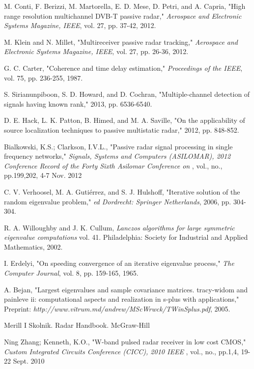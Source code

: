 \documentclass[12pt,openany,a4paper]{book}
\begin{document}
\begin{thebibliography}{99}
 M. Conti, F. Berizzi, M. Martorella, E. D. Mese, D. Petri, and A. Capria, "High range resolution multichannel DVB-T passive radar," \emph{Aerospace and Electronic Systems Magazine, IEEE}, vol. 27, pp. 37-42, 2012.

 M. Klein and N. Millet, "Multireceiver passive radar tracking," \emph{Aerospace and Electronic Systems Magazine, IEEE}, vol. 27, pp. 26-36, 2012.

 G. C. Carter, "Coherence and time delay estimation," \emph{Proceedings of the IEEE}, vol. 75, pp. 236-255, 1987.

 S. Sirianunpiboon, S. D. Howard, and D. Cochran, "Multiple-channel detection of signals having known rank," 2013, pp. 6536-6540.

 D. E. Hack, L. K. Patton, B. Himed, and M. A. Saville, "On the applicability of source localization techniques to passive multistatic radar," 2012, pp. 848-852.

 Bialkowski, K.S.; Clarkson, I.V.L., "Passive radar signal processing in single frequency networks," \emph{Signals, Systems and Computers (ASILOMAR), 2012 Conference Record of the Forty Sixth Asilomar Conference on} , vol., no., pp.199,202, 4-7 Nov. 2012

 C. V. Verhoosel, M. A. Gutiérrez, and S. J. Hulshoff, "Iterative solution of the random eigenvalue problem," \emph{ed Dordrecht: Springer Netherlands}, 2006, pp. 304-304.

 R. A. Willoughby and J. K. Cullum, \emph{Lanczos algorithms for large symmetric eigenvalue computations} vol. 41. Philadelphia: Society for Industrial and Applied Mathematics, 2002.

 I. Erdelyi, "On speeding convergence of an iterative eigenvalue process," \emph{The Computer Journal}, vol. 8, pp. 159-165, 1965.

 A. Bejan, "Largest eigenvalues and sample covariance matrices. tracy-widom and painleve ii: computational aspects and realization in s-plus with applications," Preprint: \emph{http://www.vitrum.md/andrew/MScWrwck/TWinSplus.pdf}, 2005.

 Merill I Skolnik. Radar Handbook. McGraw-Hill

 Ning Zhang; Kenneth, K.O., "W-band pulsed radar receiver in low cost CMOS," \emph{Custom Integrated Circuits Conference (CICC), 2010 IEEE} , vol., no., pp.1,4, 19-22 Sept. 2010


\end{thebibliography}
\end{document}
